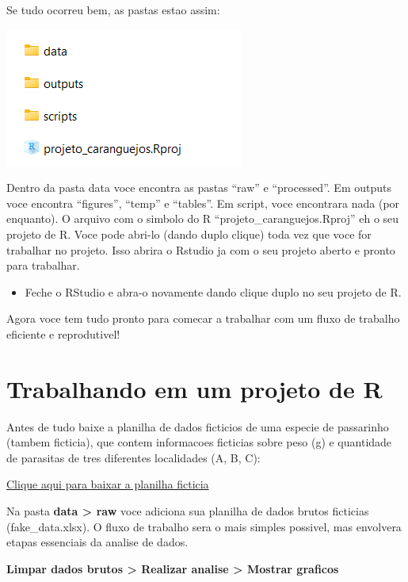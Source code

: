 \documentclass[
]{book}
\providecommand{\tightlist}{%
  \setlength{\itemsep}{0pt}\setlength{\parskip}{0pt}}
\begin{document}
Se tudo ocorreu bem, as pastas estao assim:

\includegraphics{img/pastas_do_projeto.png}

Dentro da pasta data voce encontra as pastas ``raw'' e ``processed''. Em outputs voce encontra ``figures'', ``temp'' e ``tables''. Em script, voce encontrara nada (por enquanto). O arquivo com o simbolo do R ``projeto\_caranguejos.Rproj'' eh o seu projeto de R. Voce pode abri-lo (dando duplo clique) toda vez que voce for trabalhar no projeto. Isso abrira o Rstudio ja com o seu projeto aberto e pronto para trabalhar.

\begin{itemize}
\tightlist
\item
  Feche o RStudio e abra-o novamente dando clique duplo no seu projeto de R.
\end{itemize}

Agora voce tem tudo pronto para comecar a trabalhar com um fluxo de trabalho eficiente e reprodutivel!

\hypertarget{trabalhando-em-um-projeto-de-r}{%
\section{Trabalhando em um projeto de R}\label{trabalhando-em-um-projeto-de-r}}

Antes de tudo baixe a planilha de dados ficticios de uma especie de passarinho (tambem ficticia), que contem informacoes ficticias sobre peso (g) e quantidade de parasitas de tres diferentes localidades (A, B, C):

\href{data/fake_data.xlsx}{Clique aqui para baixar a planilha ficticia}

Na pasta \textbf{data \textgreater{} raw} voce adiciona sua planilha de dados brutos ficticias (fake\_data.xlsx). O fluxo de trabalho sera o mais simples possivel, mas envolvera etapas essenciais da analise de dados.

\textbf{Limpar dados brutos \textgreater{} Realizar analise \textgreater{} Mostrar graficos}
\end{document}

